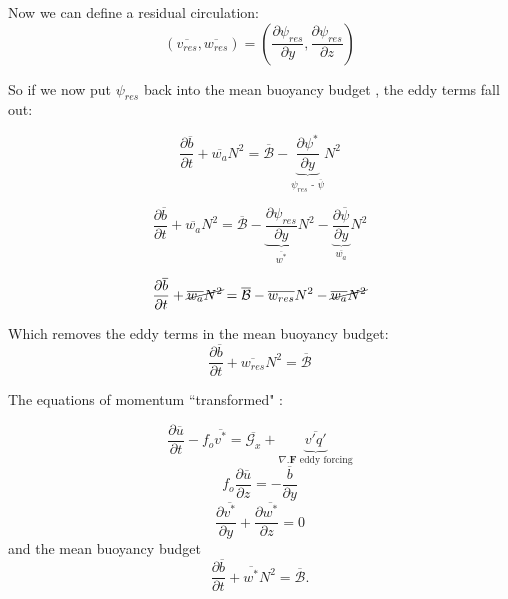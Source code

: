 Now we can define a residual circulation:
\begin{equation}
(\overline{v_{res}},\overline{w_{res}})=(\frac{\partial \psi _{res}}{\partial y},\frac{\partial \psi _{res}}{\partial z})
\end{equation}

So if we now put $\psi _{res}$ back into the mean buoyancy budget , the eddy terms fall out:

\begin{equation*}
\frac{\partial\overline{b}}{\partial t} + \overline{w_a}N^2= \overline{\mathcal{B}}- \underbrace{\frac{\partial \psi ^*}{\partial y}}_\text{$\psi _{res}$ - $\overline{\psi}$}N^2 
\end{equation*}

\begin{equation*}
\frac{\partial\overline{b}}{\partial t} + \overline{w_a}N^2= \overline{\mathcal{B}}- \underbrace{\frac{\partial \psi _{res}}{\partial y}}_\text{$\overline{w^*}$}N^2 -  \underbrace{\frac{\partial \overline{\psi}}{\partial y}}_\text{$\overline{w_a}$}N^2
\end{equation*}

\begin{equation*}
\frac{\partial\overline{b}}{\partial t} + \cancel{\overline{w_a}N^2}= \overline{\mathcal{B}}-\overline{w_{res}}N^2 - \cancel{\overline{w_a}N^2}
\end{equation*}

Which removes the eddy terms in the mean buoyancy budget:
\begin{equation}
\frac{\partial\overline{b}}{\partial t} + \overline{w_{res}}N^2= \overline{\mathcal{B}} 
\label{eq:mbbres}
\end{equation}

The equations of momentum ``transformed" :

\begin{equation}
\frac{\partial \overline{u}}{\partial t} - f_o \overline{v^*} = \overline{\mathcal{G}_x}+\underbrace{\overline{v'q'}}_\text{$\nabla . \textbf{F}$ eddy forcing}
\label{eq:momres}
\end{equation}
\begin{equation}
f_o \frac{\partial \overline{u}}{\partial z} = -\frac{\overline{b}}{\partial y}
\end{equation}
\begin{equation}
\frac{\partial \overline{v^*}}{\partial y} + \frac{\partial \overline{w^*}}{\partial z} = 0
\label{eq:cont}
\end{equation}
and the mean buoyancy budget
\begin{equation*}
\frac{\partial\overline{b}}{\partial t} + \overline{w^*}N^2= \overline{\mathcal{B}}.
\end{equation*}

